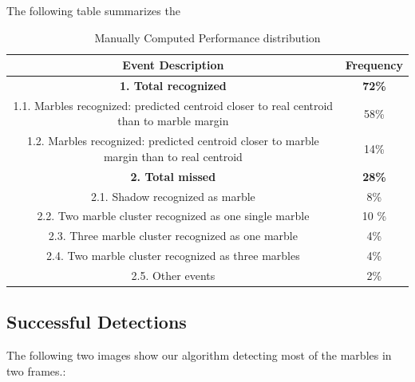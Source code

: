 \documentclass[10pt,a4paper,onecolumn]{report}
\begin{document}
The following table summarizes the 
\begin{table}[ht]
	
	\centering
	\setlength{\extrarowheight}{1.5pt}
	\begin{tabular}{| c | c |} 
		\hline
		Event Description & Frequency \\ [0.5ex] %
		\hline \hline \hline %
		\textbf{1. Total recognized} & \textbf{72\%} \\
		1.1. Marbles recognized: predicted centroid closer to real centroid than to marble margin & 58\% \\
		1.2. Marbles recognized: predicted centroid closer to marble margin than to real centroid & 14\% \\
		\hline \hline
		\textbf{2. Total missed} & \textbf{28\%} \\
		2.1. Shadow recognized as marble & 8\% \\
		2.2. Two marble cluster recognized as one single marble & 10 \% \\
		2.3. Three marble cluster recognized as one marble & 4\%	\\
		2.4. Two marble cluster recognized as three marbles & 4\% \\
		2.5. Other events & 2\% \\ [1ex] %
		\hline %
	\end{tabular}
	\caption{Manually Computed Performance distribution}
\end{table}

\subsection{Successful Detections}

The following two images show our algorithm detecting most of the marbles in two frames.:
\end{document}
